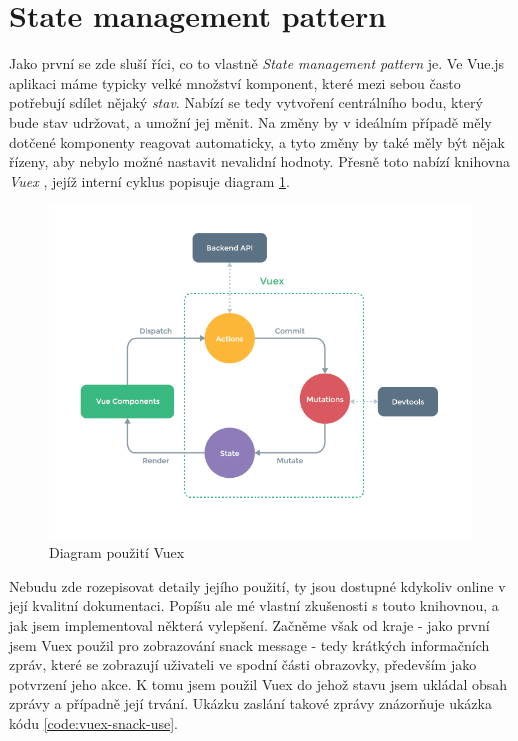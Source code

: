 
\section{State management pattern} \label{impl:vuex}

Jako první se zde sluší říci, co to vlastně \emph{State management pattern} je. Ve Vue.js aplikaci máme typicky velké množství komponent, které mezi sebou často potřebují sdílet nějaký \emph{stav}. Nabízí se tedy vytvoření centrálního bodu, který bude stav udržovat, a umožní jej měnit. Na změny by v ideálním případě měly dotčené komponenty reagovat automaticky, a tyto změny by také měly být nějak řízeny, aby nebylo možné nastavit nevalidní hodnoty. Přesně toto nabízí knihovna \emph{Vuex} \cite{vuex}, jejíž interní cyklus popisuje diagram \ref{picture:vuex}.

\begin{figure}[h]
\includegraphics[width=\textwidth]{../png/diagrams/vuex.png}
\caption{Diagram použití Vuex}\label{picture:vuex}
\end{figure}

Nebudu zde rozepisovat detaily jejího použití, ty jsou dostupné kdykoliv online v její kvalitní dokumentaci. Popíšu ale mé vlastní zkušenosti s touto knihovnou, a jak jsem implementoval některá vylepšení. Začněme však od kraje - jako první jsem Vuex použil pro zobrazování snack message - tedy krátkých informačních zpráv, které se zobrazují uživateli ve spodní části obrazovky, především jako potvrzení jeho akce. K tomu jsem použil Vuex do jehož stavu jsem ukládal obsah zprávy a případně její trvání. Ukázku zaslání takové zprávy znázorňuje ukázka kódu \ref{code:vuex-snack-use}.

